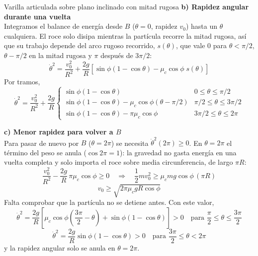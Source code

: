 \begin{solucion}{Varilla articulada sobre plano inclinado con mitad rugosa}
\textbf{b) Rapidez angular durante una vuelta}\\
Integramos el balance de energía desde $B$ ($\theta=0$, rapidez $v_0$) hasta un $\theta$ cualquiera. El roce solo disipa mientras la partícula recorre la mitad rugosa, así que su trabajo depende del arco rugoso recorrido, $s(\theta)$, que vale $0$ para $\theta<\pi/2$, $\theta-\pi/2$ en la mitad rugosa y $\pi$ después de $3\pi/2$:
$$\dot\theta^2=\frac{v_0^2}{R^2}+\frac{2g}{R}\left[\sin\phi\left(1-\cos\theta\right)-\mu_c\cos\phi\;s(\theta)\right]$$
Por tramos,
$$\dot\theta^2=\frac{v_0^2}{R^2}+\frac{2g}{R}\begin{cases}\sin\phi\left(1-\cos\theta\right) & 0\le\theta\le\pi/2\\[2pt] \sin\phi\left(1-\cos\theta\right)-\mu_c\cos\phi\left(\theta-\pi/2\right) & \pi/2\le\theta\le3\pi/2\\[2pt] \sin\phi\left(1-\cos\theta\right)-\pi\mu_c\cos\phi & 3\pi/2\le\theta\le2\pi\end{cases}$$

\textbf{c) Menor rapidez para volver a $B$}\\
Para pasar de nuevo por $B$ ($\theta=2\pi$) se necesita $\dot\theta^2(2\pi)\ge0$. En $\theta=2\pi$ el término del peso se anula ($\cos2\pi=1$): la gravedad no gasta energía en una vuelta completa y solo importa el roce sobre media circunferencia, de largo $\pi R$:
$$\frac{v_0^2}{R^2}-\frac{2g}{R}\,\pi\mu_c\cos\phi\ge0\quad\Longrightarrow\quad\frac{1}{2}mv_0^2\ge\mu_c mg\cos\phi\,(\pi R)$$
$$v_0\ge\sqrt{2\pi\mu_c gR\cos\phi}$$
Falta comprobar que la partícula no se detiene antes. Con este valor,
$$\dot\theta^2=\frac{2g}{R}\left[\mu_c\cos\phi\left(\frac{3\pi}{2}-\theta\right)+\sin\phi\left(1-\cos\theta\right)\right]>0\quad\text{para }\frac{\pi}{2}\le\theta\le\frac{3\pi}{2}$$
$$\dot\theta^2=\frac{2g}{R}\sin\phi\left(1-\cos\theta\right)>0\quad\text{para }\frac{3\pi}{2}\le\theta<2\pi$$
y la rapidez angular solo se anula en $\theta=2\pi$.

\end{solucion}
